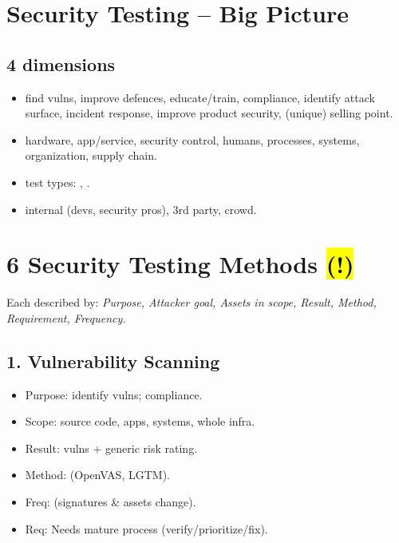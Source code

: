 

\section{Security Testing -- Big Picture}

\subsection{4 dimensions}
\begin{itemize}
\item {} find vulns, improve defences, educate/train, compliance, identify attack surface, incident response, improve product security, (unique) selling point.
\item {} hardware, app/service, security control, humans, processes, systems, organization, supply chain.
\item {} test types: , .
\item {} internal (devs, security pros), 3rd party, crowd.
\end{itemize}

\section{6 Security Testing Methods \hl{(!)}}

Each described by: \textit{Purpose, Attacker goal, Assets in scope, Result, Method, Requirement, Frequency.}

\subsection{1. Vulnerability Scanning}
\begin{itemize}
\item Purpose: identify  vulns; compliance.
\item Scope: source code, apps, systems, whole infra. 
\item Result:  vulns + generic risk rating.
\item Method:  (OpenVAS, LGTM).
\item Freq:  (signatures \& assets change).
\item Req: Needs mature  process (verify/prioritize/fix).
\end{itemize}

